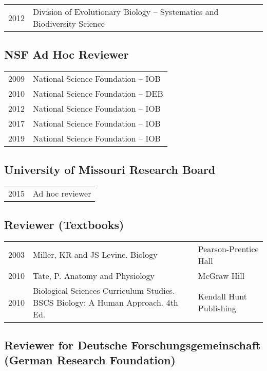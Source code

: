 \documentclass[10pt,letterpaper,]{article}
\begin{document}
\begin{tabular}{ll}
  2012 & Division of Evolutionary Biology -- Systematics and Biodiversity Science \\ 
  \end{tabular}

\hypertarget{nsf-ad-hoc-reviewer}{%
\subsection{NSF Ad Hoc Reviewer}\label{nsf-ad-hoc-reviewer}}

\begin{tabular}{ll}
  2009 & National Science Foundation -- IOB \\ 
  2010 & National Science Foundation -- DEB \\ 
  2012 & National Science Foundation -- IOB \\ 
  2017 & National Science Foundation -- IOB \\ 
  2019 & National Science Foundation -- IOB \\ 
  \end{tabular}

\hypertarget{university-of-missouri-research-board}{%
\subsection{University of Missouri Research
Board}\label{university-of-missouri-research-board}}

\begin{tabular}{ll}
  2015 & Ad hoc reviewer \\ 
  \end{tabular}

\hypertarget{reviewer-textbooks}{%
\subsection{Reviewer (Textbooks)}\label{reviewer-textbooks}}

\begin{tabular}{lll}
  2003 & Miller, KR and JS Levine. Biology & Pearson-Prentice Hall \\ 
  2010 & Tate, P. Anatomy and Physiology & McGraw Hill \\ 
  2010 & Biological Sciences Curriculum Studies. BSCS Biology: A Human Approach. 4th Ed. & Kendall Hunt Publishing \\ 
  \end{tabular}

\hypertarget{reviewer-for-deutsche-forschungsgemeinschaft-german-research-foundation}{%
\subsection{Reviewer for Deutsche Forschungsgemeinschaft (German
Research
Foundation)}\label{reviewer-for-deutsche-forschungsgemeinschaft-german-research-foundation}}
\end{document}
